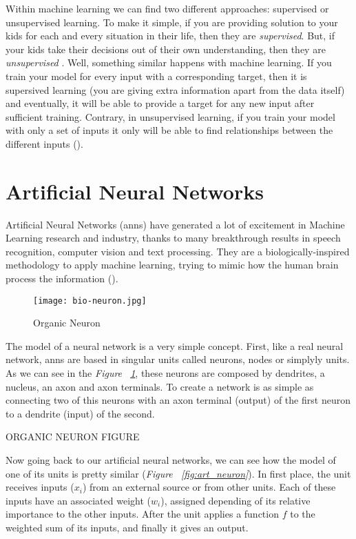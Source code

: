 Within machine learning we can find two different approaches: supervised or unsupervised learning. To make it simple, if you are providing solution to your kids for each and every situation in their life, then they are \textit{supervised}. But, if your kids take their decisions out of their own understanding, then they are \textit{unsupervised} . Well, something similar happens with machine learning. If you train your model for every input with a corresponding target, then it is supersived learning (you are giving extra information apart from the data itself) and eventually, it will be able to provide a target for any new input after sufficient training. Contrary, in unsupervised learning, if you train your model with only a set of inputs it only will be able to find relationships between the different inputs (\cite{sup_unsup_learning}). 

\section{Artificial Neural Networks}
Artificial Neural Networks (\glspl{ann}) have generated a lot of excitement in Machine Learning research and industry, thanks to many breakthrough results in speech recognition, computer vision and text processing. They are a biologically-inspired methodology to apply machine learning, trying to mimic how the human brain process the information (\cite{intro_ann}). 

\begin{figure}[h!b]
	\centering
	\texttt{[image: bio-neuron.jpg]}
	\caption{Organic Neuron}
	\label{fig:org_neuron}
\end{figure}

The model of a neural network is a very simple concept. First, like a real neural network, \glspl{ann} are based in singular units called neurons, nodes or simplyly units. As we can see in the \textit{Figure ~\ref{fig:org_neuron}}, these neurons are composed by dendrites, a nucleus, an axon and axon terminals. To create a network is as simple as connecting two of this neurons with an axon terminal (output) of the first neuron to a dendrite (input) of the second.

ORGANIC NEURON FIGURE

Now going back to our artificial neural networks, we can see how the model of one of its units is pretty similar (\textit{Figure ~\ref{fig:art_neuron}}). In first place, the unit receives inputs ($x_i$) from an external source or from other units. Each of these inputs have an associated weight ($w_i$), assigned depending of its relative importance to the other inputs. After the unit applies a function $f$ to the weighted sum of its inputs, and finally it gives an output.

